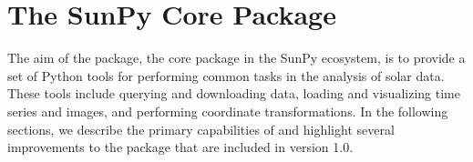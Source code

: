 \section{The SunPy Core Package}
\label{sec:sunpycore}

The aim of the \sunpypkg package, the core package in the SunPy ecosystem, is to provide a set of Python tools for performing common tasks in the analysis of solar data.
These tools include querying and downloading data, loading and visualizing time series and images, and performing coordinate transformations.
In the following sections, we describe the primary capabilities of \sunpypkg and highlight several improvements to the package that are included in version 1.0.
